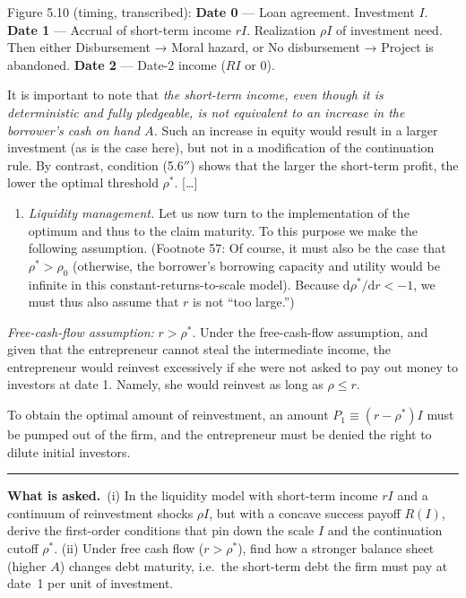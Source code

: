 \documentclass[11pt,a4paper]{article}
\newcommand{\asked}{\par\medskip\noindent\textbf{What is asked.}~}
\providecommand{\tightlist}{\setlength{\itemsep}{0pt}\setlength{\parskip}{0pt}}
\newcommand{\stmtend}{\par\endgroup\nopagebreak\noindent\rule{\linewidth}{0.4pt}\par\medskip}
\begin{document}
Figure 5.10 (timing, transcribed): \textbf{Date 0} --- Loan agreement. Investment \(I\).
\textbf{Date 1} --- Accrual of short-term income \(rI\). Realization \(\rho I\) of investment need.
Then either Disbursement → Moral hazard, or No disbursement → Project is abandoned. \textbf{Date 2}
--- Date-2 income (\(RI\) or 0).

It is important to note that \emph{the short-term income, even though it is deterministic and fully
pledgeable, is not equivalent to an increase in the borrower's cash on hand \(A\).} Such an increase
in equity would result in a larger investment (as is the case here), but not in a modification of
the continuation rule. By contrast, condition (5.6\(''\)) shows that the larger the short-term
profit, the lower the optimal threshold \(\rho^*\). {[}\ldots{]}

\begin{enumerate}
\def\labelenumi{(\alph{enumi})}
\tightlist
\item
  \emph{Liquidity management.} Let us now turn to the implementation of the optimum and thus to the
  claim maturity. To this purpose we make the following assumption. (Footnote 57: Of course, it must
  also be the case that \(\rho^* > \rho_0\) (otherwise, the borrower's borrowing capacity and
  utility would be infinite in this constant-returns-to-scale model). Because
  \(\mathrm{d}\rho^*/\mathrm{d}r < -1\), we must thus also assume that \(r\) is not ``too large.'')
\end{enumerate}

\emph{Free-cash-flow assumption:} \(r > \rho^*\). Under the free-cash-flow assumption, and given
that the entrepreneur cannot steal the intermediate income, the entrepreneur would reinvest
excessively if she were not asked to pay out money to investors at date 1. Namely, she would
reinvest as long as \(\rho \leqslant r\).

To obtain the optimal amount of reinvestment, an amount \(P_1 \equiv (r - \rho^*)I\) must be pumped
out of the firm, and the entrepreneur must be denied the right to dilute initial investors.
\stmtend

\asked (i) In the liquidity model with short-term income $rI$ and a continuum of reinvestment shocks
$\rho I$, but with a concave success payoff $R(I)$, derive the first-order conditions that pin down the
scale $I$ and the continuation cutoff $\rho^*$. (ii) Under free cash flow ($r>\rho^*$), find how a
stronger balance sheet (higher $A$) changes debt maturity, i.e.\ the short-term debt the firm must pay at
date~1 per unit of investment.
\end{document}
